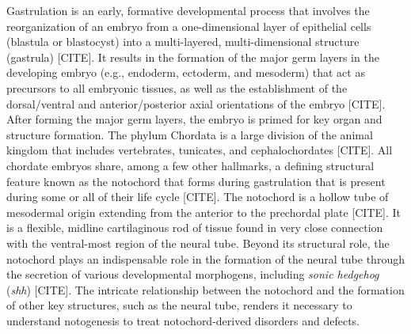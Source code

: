 Gastrulation is an early, formative developmental process that involves the reorganization of an embryo from a one-dimensional layer of epithelial cells (blastula or blastocyst) into a multi-layered, multi-dimensional structure (gastrula) [CITE]. It results in the formation of the major germ layers in the developing embryo (e.g., endoderm, ectoderm, and mesoderm) that act as precursors to all embryonic tissues, as well as the establishment of the dorsal/ventral and anterior/posterior axial orientations of the embryo [CITE]. After forming the major germ layers, the embryo is primed for key organ and structure formation. The phylum Chordata is a large division of the animal kingdom that includes vertebrates, tunicates, and cephalochordates [CITE]. All chordate embryos share, among a few other hallmarks, a defining structural feature known as the notochord that forms during gastrulation that is present during some or all of their life cycle [CITE]. The notochord is a hollow tube of mesodermal origin extending from the anterior to the prechordal plate [CITE]. It is a flexible, midline cartilaginous rod of tissue found in very close connection with the ventral-most region of the neural tube. Beyond its structural role, the notochord plays an indispensable role in the formation of the neural tube through the secretion of various developmental morphogens, including \textit{sonic hedgehog} (\textit{shh}) [CITE]. The intricate relationship between the notochord and the formation of other key structures, such as the neural tube, renders it necessary to understand notogenesis to treat notochord-derived disorders and defects. 

